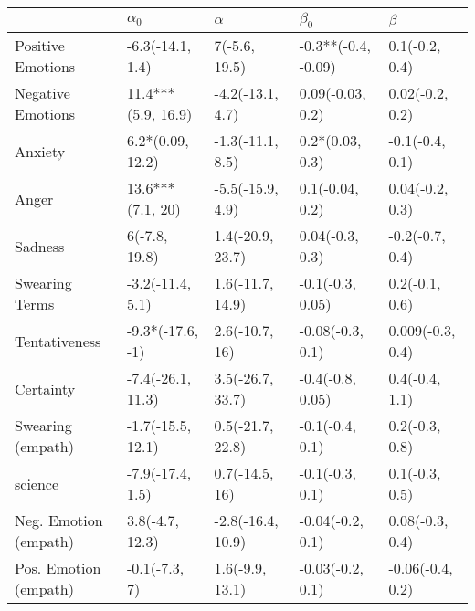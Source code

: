 \begin{tabular}{lllll}
\toprule
{} &          $\alpha_0$ &           $\alpha$ &            $\beta_0$ &           $\beta$ \\
\midrule
Positive Emotions     &    -6.3(-14.1, 1.4) &      7(-5.6, 19.5) &  -0.3**(-0.4, -0.09) &    0.1(-0.2, 0.4) \\
Negative Emotions     &  11.4***(5.9, 16.9) &   -4.2(-13.1, 4.7) &     0.09(-0.03, 0.2) &   0.02(-0.2, 0.2) \\
Anxiety               &    6.2*(0.09, 12.2) &   -1.3(-11.1, 8.5) &      0.2*(0.03, 0.3) &   -0.1(-0.4, 0.1) \\
Anger                 &    13.6***(7.1, 20) &   -5.5(-15.9, 4.9) &      0.1(-0.04, 0.2) &   0.04(-0.2, 0.3) \\
Sadness               &       6(-7.8, 19.8) &   1.4(-20.9, 23.7) &      0.04(-0.3, 0.3) &   -0.2(-0.7, 0.4) \\
Swearing Terms        &    -3.2(-11.4, 5.1) &   1.6(-11.7, 14.9) &     -0.1(-0.3, 0.05) &    0.2(-0.1, 0.6) \\
Tentativeness         &    -9.3*(-17.6, -1) &     2.6(-10.7, 16) &     -0.08(-0.3, 0.1) &  0.009(-0.3, 0.4) \\
Certainty             &   -7.4(-26.1, 11.3) &   3.5(-26.7, 33.7) &     -0.4(-0.8, 0.05) &    0.4(-0.4, 1.1) \\
Swearing (empath)     &   -1.7(-15.5, 12.1) &   0.5(-21.7, 22.8) &      -0.1(-0.4, 0.1) &    0.2(-0.3, 0.8) \\
science               &    -7.9(-17.4, 1.5) &     0.7(-14.5, 16) &      -0.1(-0.3, 0.1) &    0.1(-0.3, 0.5) \\
Neg. Emotion (empath) &     3.8(-4.7, 12.3) &  -2.8(-16.4, 10.9) &     -0.04(-0.2, 0.1) &   0.08(-0.3, 0.4) \\
Pos. Emotion (empath) &       -0.1(-7.3, 7) &    1.6(-9.9, 13.1) &     -0.03(-0.2, 0.1) &  -0.06(-0.4, 0.2) \\
\bottomrule
\end{tabular}
